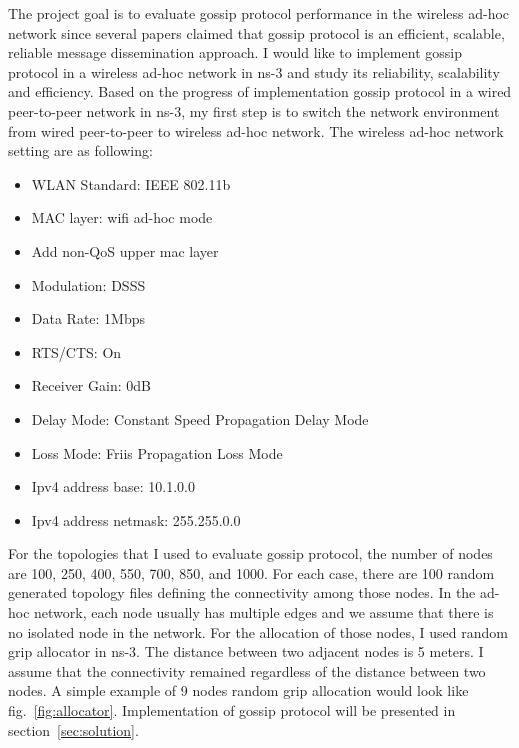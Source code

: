 The project goal is to evaluate gossip protocol performance in the wireless ad-hoc network since several papers\cite{gossip}\cite{gossip2} claimed that gossip protocol is an efficient, scalable, reliable message dissemination approach. I would like to implement gossip protocol in a wireless ad-hoc network in ns-3 and study its reliability, scalability and efficiency. Based on the progress of implementation gossip protocol in a wired peer-to-peer network in ns-3, my first step is to switch the network environment from wired peer-to-peer to wireless ad-hoc network. The wireless ad-hoc network setting are as following:

\begin{itemize}
	\item WLAN Standard: IEEE 802.11b
	\item MAC layer: wifi ad-hoc mode
	\item Add non-QoS upper mac layer
	\item Modulation: DSSS
	\item Data Rate: 1Mbps
	\item RTS/CTS: On
	\item Receiver Gain: 0dB
	\item Delay Mode: Constant Speed Propagation Delay Mode
	\item Loss Mode: Friis Propagation Loss Mode
	\item Ipv4 address base: 10.1.0.0
	\item Ipv4 address netmask: 255.255.0.0
\end{itemize}

For the topologies that I used to evaluate gossip protocol, the number of nodes are 100, 250, 400, 550, 700, 850, and 1000. For each case, there are 100 random generated topology files defining the connectivity among those nodes. In the ad-hoc network, each node usually has multiple edges and we assume that there is no isolated node in the network. For the allocation of those nodes, I used random grip allocator in ns-3. The distance between two adjacent nodes is 5 meters. I assume that the connectivity remained regardless of the distance between two nodes. A simple example of 9 nodes random grip allocation would look like fig.~\ref{fig:allocator}. Implementation of gossip protocol will be presented in section~\ref{sec:solution}. 


